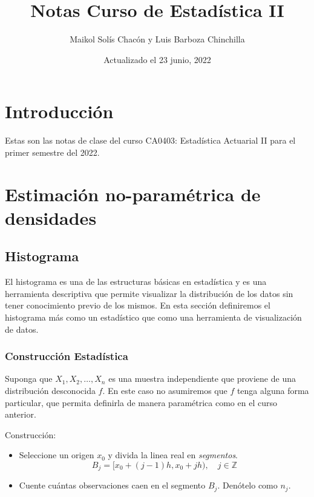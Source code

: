 \documentclass[
  12pt,
]{book}
\title{Notas Curso de Estadística II}
\author{Maikol Solís Chacón y Luis Barboza Chinchilla}
\date{Actualizado el 23 junio, 2022}
\theoremstyle{definition}
\theoremstyle{definition}
\theoremstyle{definition}
\theoremstyle{definition}
\theoremstyle{remark}
\begin{document}
\maketitle

{
\hypersetup{linkcolor=}
\setcounter{tocdepth}{4}
\tableofcontents
}
\hypertarget{introducciuxf3n}{%
\chapter{Introducción}\label{introducciuxf3n}}

Estas son las notas de clase del curso CA0403: Estadística Actuarial II para el primer semestre del 2022.

\hypertarget{estimaciuxf3n-no-paramuxe9trica-de-densidades}{%
\chapter{Estimación no-paramétrica de densidades}\label{estimaciuxf3n-no-paramuxe9trica-de-densidades}}

\hypertarget{histograma}{%
\section{Histograma}\label{histograma}}

El histograma es una de las estructuras básicas en estadística y es una herramienta descriptiva que permite visualizar la distribución de los datos sin tener conocimiento previo de los mismos. En esta sección definiremos el histograma más como un estadístico que como una herramienta de visualización de datos.

\hypertarget{construcciuxf3n-estaduxedstica}{%
\subsection{Construcción Estadística}\label{construcciuxf3n-estaduxedstica}}

Suponga que \(X_1,X_2, \dots ,X_n\) es una muestra independiente que proviene de una distribución desconocida \(f\). En este caso no asumiremos que \(f\) tenga alguna forma particular, que permita definirla de manera paramétrica como en el curso anterior.

Construcción:

\begin{itemize}
\item
  Seleccione un origen \(x_0\) y divida la linea real en \emph{segmentos}.
  \begin{equation*}
  B_j = [x_0 +(j - 1)h,x_0 + jh), \quad j\in \mathbb{Z}
  \end{equation*}
\item
  Cuente cuántas observaciones caen en el segmento \(B_j\). Denótelo como \(n_j\).
\end{itemize}
\end{document}
